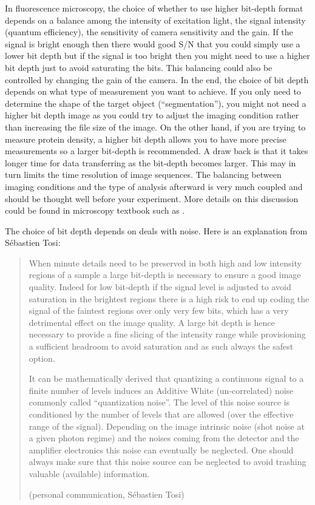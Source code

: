 In fluorescence microscopy, the choice of whether to use higher bit-depth format depends on a balance among the intensity of excitation light,  the signal intensity (quantum efficiency), the sensitivity of camera sensitivity and the gain. If the signal is bright enough then there would good S/N that you could simply use a lower bit depth but if the signal is too bright then you might need to use a higher bit depth just to avoid saturating the bits. This balancing could also be controlled by changing the gain of the camera. In the end, the choice of bit depth depends on what type of measurement you want to achieve. 
If you only need to determine the shape of the target object (``segmentation''), you might not need a higher bit depth image as you could try to adjust the imaging condition rather than increasing the file size of the image. 
On the other hand, if you are trying to measure protein density, a higher bit depth allows you to have more precise measurements so a larger bit-depth is recommended. A draw back is that it takes longer time for data transferring as the bit-depth becomes larger. This may in turn limits the time resolution of image sequences.
The balancing between imaging conditions and the type of  analysis afterward is very much coupled and should be thought well before your experiment. More details on this discussion could be found in microscopy textbook such as \cite{Pawley2006}. 

The choice of bit depth depends on deals with noise. Here is an explanation from S\'{e}bastien Tosi:
\begin{quote}
When minute details need to be preserved in both high and low intensity regions of a sample a large bit-depth is necessary to ensure a good image quality. Indeed for low bit-depth if the signal level is adjusted to avoid saturation in the brightest regions there is a high risk to end up coding the signal of the faintest regions over only very few bits, which has a very detrimental effect on the image quality. A large bit depth is hence necessary to provide a fine slicing of the intensity range while provisioning a sufficient headroom to avoid saturation and as such always the safest option. 

It can be mathematically derived that quantizing a continuous signal to a finite number of levels induces an Additive White (un-correlated) noise commonly called ``quantization noise''. The level of this noise source is conditioned by the number of levels that are allowed (over the effective range of the signal). Depending on the image intrinsic noise (shot noise at a given photon regime) and the noises coming from the detector and the amplifier electronics this noise can eventually be neglected. One should always make sure that this noise source can be neglected to avoid trashing valuable (available) information.

(personal communication, S\'{e}bastien Tosi)
\end{quote}



